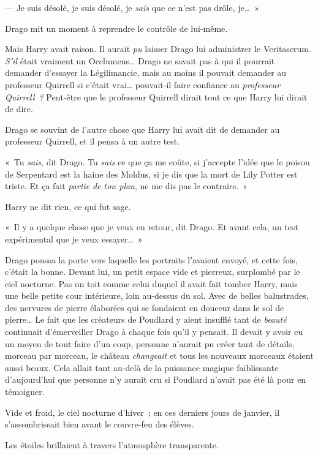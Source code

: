 --- Je suis désolé, je suis désolé, je \emph{sais} que ce n'est pas drôle, je…~»

Drago mit un moment à reprendre le contrôle de lui-même.

Mais Harry avait raison.
Il aurait \emph{pu} laisser Drago lui administrer le Veritaserum.
\emph{S'il} était vraiment un Occlumens…
Drago ne savait pas à qui il pourrait demander d'essayer la Légilimancie, mais au moins il pouvait demander au professeur Quirrell si c'était vrai… pouvait-il faire confiance au \emph{professeur Quirrell~?} Peut-être que le professeur Quirrell dirait tout ce que Harry lui dirait de dire.

Drago se souvint de l'autre chose que Harry lui avait dit de demander au professeur Quirrell, et il pensa à un autre test.

«~Tu \emph{sais}, dit Drago.
Tu \emph{sais} ce que ça me coûte, si j'accepte l'idée que le poison de Serpentard est la haine des Moldus, si je dis que la mort de Lily Potter est triste.
Et ça fait \emph{partie} \emph{de ton plan}, ne me dis pas le contraire.~»

Harry ne dit rien, ce qui fut sage.

«~Il y a quelque chose que je veux en retour, dit Drago.
Et avant cela, un test expérimental que je veux essayer…~»

\later

Drago poussa la porte vers laquelle les portraits l'avaient envoyé, et cette fois, c'était la bonne.
Devant lui, un petit espace vide et pierreux, surplombé par le ciel nocturne.
Pas un toit comme celui duquel il avait fait tomber Harry, mais une belle petite cour intérieure, loin au-dessus du sol.
Avec de belles balustrades, des nervures de pierre élaborées qui se fondaient en douceur dans le sol de pierre…
Le fait que les créateurs de Poudlard y aient insufflé tant de \emph{beauté} continuait d'émerveiller Drago à chaque fois qu'il y pensait.
Il devait y avoir eu un moyen de tout faire d'un coup, personne n'aurait pu créer tant de détails, morceau par morceau, le château \emph{changeait} et tous les nouveaux morceaux étaient aussi beaux.
Cela allait tant au-delà de la puissance magique faiblissante d'aujourd'hui que personne n'y aurait cru si Poudlard n'avait pas été là pour en témoigner.

Vide et froid, le ciel nocturne d'hiver~; en ces derniers jours de janvier, il s'assombrissait bien avant le couvre-feu des élèves.

Les étoiles brillaient à travers l'atmosphère transparente.

